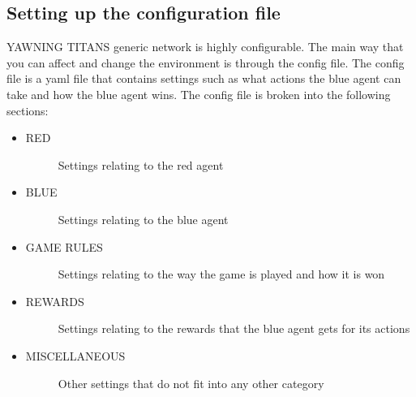 \documentclass[letterpaper,10pt,english]{sphinxmanual}
\begin{document}
\subsection{Setting up the configuration file}
\label{\detokenize{source/getting_started:setting-up-the-configuration-file}}
\sphinxAtStartPar
YAWNING TITANS generic network is highly configurable. The main way that you can affect
and change the environment is through the config file. The config file is a yaml file that
contains settings such as what actions the blue agent can take and how the blue agent
wins. The config file is broken into the following sections:
\begin{itemize}
\item {} \begin{description}
\item[{RED}] \leavevmode
\sphinxAtStartPar
Settings relating to the red agent

\end{description}

\item {} \begin{description}
\item[{BLUE}] \leavevmode
\sphinxAtStartPar
Settings relating to the blue agent

\end{description}

\item {} \begin{description}
\item[{GAME RULES}] \leavevmode
\sphinxAtStartPar
Settings relating to the way the game is played and how it is won

\end{description}

\item {} \begin{description}
\item[{REWARDS}] \leavevmode
\sphinxAtStartPar
Settings relating to the rewards that the blue agent gets for its actions

\end{description}

\item {} \begin{description}
\item[{MISCELLANEOUS}] \leavevmode
\sphinxAtStartPar
Other settings that do not fit into any other category

\end{description}

\end{itemize}
\end{document}
